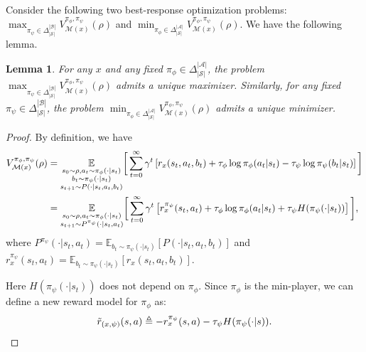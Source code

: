 \documentclass{article}
\theoremstyle{plain}
\newtheorem{lemma}{Lemma}
\theoremstyle{definition}
\theoremstyle{remark}
\def\cA{\mathcal A}
\def\cB{\mathcal B}
\def\cM{\mathcal M}
\def\cS{\mathcal S}
\def\bydef{\triangleq}
\begin{document}
Consider the following two best-response optimization problems: $\max_{\pi_\psi \in \Delta_{|\cS|}^{|\cB|}} V_{\cM(x)}^{\pi_\phi,\pi_\psi}(\rho)$ and $\min_{\pi_\phi \in \Delta_{|\cS|}^{|\cA|}} V_{\cM(x)}^{\pi_\phi,\pi_\psi}(\rho)$. We have the following lemma.
\begin{lemma}
    \label{lemma: existence-and-uniqueness-of-solutions-to-one-side-problems}
    For any $x$ and any fixed
$\pi_\phi \in \Delta_{|\cS|}^{|\cA|}$, the problem
 $\max_{\pi_\psi \in \Delta_{|\cS|}^{|\cB|}}
V_{\cM(x)}^{\pi_\phi,\pi_\psi}(\rho)$ admits a unique maximizer. Similarly, for any fixed
$\pi_\psi \in \Delta_{|\cS|}^{|\cB|}$, the problem $
\min_{\pi_\phi \in \Delta_{|\cS|}^{|\cA|}}
V_{\cM(x)}^{\pi_\phi,\pi_\psi}(\rho)$ admits a unique minimizer.
\end{lemma}
\begin{proof}
    By definition, we have
    \begin{align}
        V^{\pi_\phi,\pi_\psi}_{\cM(x)}(\rho) & = \underset{\substack{s_0 \sim \rho, a_t \sim \pi_\phi(\cdot|s_t) \\ b_t \sim \pi_\psi(\cdot|s_t) \\s_{t+1} \sim P(\cdot|s_t,a_t,b_t)}}{\mathbb{E}} \bigg[
            \sum_{t=0}^{\infty} \gamma^t \left[
                r_x(s_t,a_t,b_t) + \tau_\phi \log \pi_\phi(a_t|s_t) - \tau_\psi \log \pi_\psi(b_t|s_t)
            \right]   
        \bigg] \notag \\
        & = \underset{\substack{s_0 \sim \rho, a_t \sim \pi_\phi(\cdot|s_t) \\s_{t+1} \sim P^{\pi_\psi}(\cdot|s_t,a_t)}}{\mathbb{E}} \bigg[
            \sum_{t=0}^{\infty} \gamma^t \left[
                r^{\pi_\psi}_x(s_t,a_t) + \tau_\phi \log \pi_\phi(a_t|s_t) + \tau_\psi H(\pi_\psi(\cdot|s_t))
            \right]   
        \bigg],  
    \end{align}
    where $P^{\pi_\psi}(\cdot|s_t,a_t) = \mathbb{E}_{b_t \sim \pi_\psi(\cdot|s_t)}[P(\cdot|s_t,a_t,b_t)]$ and $r^{\pi_\psi}_x(s_t,a_t) = \mathbb{E}_{b_t \sim \pi_\psi(\cdot|s_t)}[r_x(s_t,a_t,b_t)]$. 
    
    Here $H(\pi_\psi(\cdot|s_t))$ does not depend on $\pi_\phi$. Since $\pi_\phi$ is the min-player, we can define a new reward model for $\pi_\phi$ as:
    \begin{align}
        \tilde{r}_{(x,\psi)}(s,a) \bydef - r^{\pi_\psi}_x(s,a) - \tau_\psi H(\pi_\psi(\cdot|s)).\notag 
    \end{align}


\end{proof}
\end{document}
